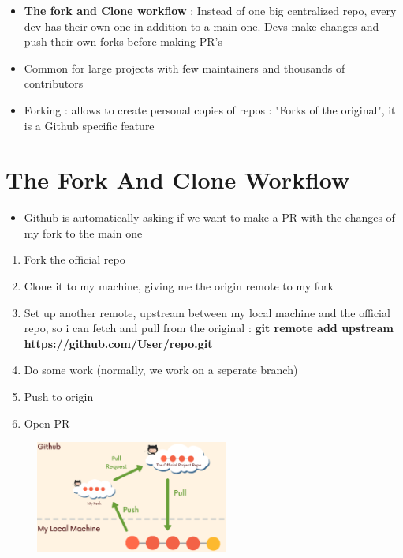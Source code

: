 \documentclass{report}
\begin{document}
\begin{itemize}
	\item \textbf{The fork and Clone workflow} : Instead of one big centralized repo, every dev has their own one in addition to a main one. Devs make changes and push their own forks before making PR's 
	\item Common for large projects with few maintainers and thousands of contributors 
	\item Forking : allows to create personal copies of repos : "Forks of the original", it is a Github specific feature
\end{itemize}


\section{The Fork And Clone Workflow}

\begin{itemize}
	\item Github is automatically asking if we want to make a PR with the changes of my fork to the main one 
\end{itemize}

\begin{enumerate}
	\item Fork the official repo 
	\item Clone it to my machine, giving me the origin remote to my fork 
	\item Set up another remote, upstream between my local machine and the official repo, so i can fetch and pull from the original : \textbf{git remote add upstream https://github.com/User/repo.git} 
	\item Do some work (normally, we work on a seperate branch)
	\item Push to origin 
	\item Open PR
\end{enumerate}
\begin{figure}[H] 
	 \centering 
	 \includegraphics[width=2.5in]{screenshots/2022-07-09T19-19-34Z.png} 
 \end{figure}
\end{document}
